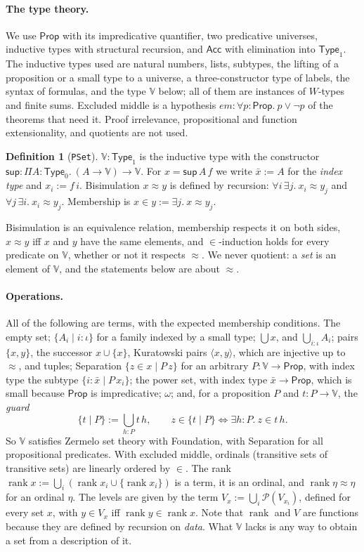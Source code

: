 \documentclass[10pt]{article}
\theoremstyle{definition}
\newtheorem{definition}[theorem]{Definition}
\theoremstyle{remark}
\newcommand{\Prop}{\mathsf{Prop}}
\newcommand{\Type}{\mathsf{Type}}
\newcommand{\rk}{\operatorname{rank}}
\newcommand{\Acc}{\mathsf{Acc}}
\newcommand{\V}{\mathbb{V}}
\newcommand{\lean}[1]{\texttt{#1}}
\newcommand{\guard}[2]{\{#1\mid #2\}}
\begin{document}
\paragraph{The type theory.}
We use $\Prop$ with its impredicative quantifier, two predicative
universes, inductive types with structural recursion, and $\Acc$ with
elimination into $\Type_1$. The inductive types used are natural numbers,
lists, subtypes, the lifting of a proposition or a small type to a
universe, a three-constructor type of labels, the syntax of formulas,
and the type $\V$ below; all of them are instances of $W$-types and
finite sums. Excluded middle is a hypothesis
$\mathit{em}:\forall p{:}\Prop.\ p\vee\neg p$ of the theorems that need
it. Proof irrelevance, propositional and function extensionality, and
quotients are not used.

\begin{definition}[\lean{PSet}]
$\V:\Type_1$ is the inductive type with the constructor
$\mathsf{sup}:\Pi A{:}\Type_0.\ (A\to\V)\to\V$. For $x=\mathsf{sup}\,A\,f$ we write
$\bar x:=A$ for the \emph{index type} and $x_i:=f\,i$. Bisimulation
$x\approx y$ is defined by recursion:
$\forall i\,\exists j.\ x_i\approx y_j$ and $\forall j\,\exists i.\ x_i\approx y_j$.
Membership is $x\in y:=\exists j.\ x\approx y_j$.
\end{definition}

Bisimulation is an equivalence relation, membership respects it on both
sides, $x\approx y$ iff $x$ and $y$ have the same elements, and
$\in$-induction holds for every predicate on $\V$, whether or not it
respects $\approx$. We never quotient: a \emph{set} is an element of $\V$,
and the statements below are about $\approx$.

\paragraph{Operations.}
All of the following are terms, with the expected membership
conditions. The empty set; $\{A_i\mid i:\iota\}$ for a family indexed
by a small type; $\bigcup x$, and $\bigcup_{i:\iota}A_i$; pairs
$\{x,y\}$, the successor $x\cup\{x\}$, Kuratowski pairs $\langle x,y\rangle$, which
are injective up to $\approx$, and tuples; Separation
$\{z\in x\mid P\,z\}$ for an arbitrary $P:\V\to\Prop$, with index type the
subtype $\{i:\bar x\mid P\,x_i\}$; the power set, with index type
$\bar x\to\Prop$, which is small because $\Prop$ is impredicative;
$\omega$; and, for a proposition $P$ and $t:P\to\V$, the \emph{guard}
\[\guard tP:=\textstyle\bigcup_{h:P}t\,h,\qquad
z\in\guard tP\iff\exists h{:}P.\ z\in t\,h.\]
So $\V$ satisfies Zermelo set theory with Foundation, with Separation
for all propositional predicates. With excluded middle, ordinals
(transitive sets of transitive sets) are linearly ordered by $\in$. The
rank $\rk x:=\bigcup_i(\rk x_i\cup\{\rk x_i\})$ is a term, it is an
ordinal, and $\rk\eta\approx\eta$ for an ordinal $\eta$. The levels are given by
the term $V_x:=\bigcup_i\mathcal P(V_{x_i})$, defined for every set
$x$, with $y\in V_x$ iff $\rk y\in\rk x$. Note that $\rk$ and $V$ are
functions because they are defined by recursion on \emph{data}. What
$\V$ lacks is any way to obtain a set from a description of it.
\end{document}
